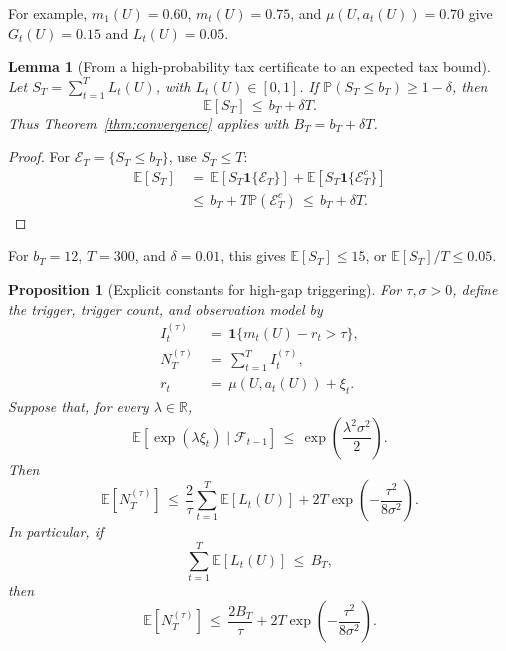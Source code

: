 \documentclass{article} %
\newtheorem{lemma}[theorem]{Lemma}
\newtheorem{proposition}[theorem]{Proposition}
\begin{document}
For example, \(m_1(U)=0.60\), \(m_t(U)=0.75\), and
\(\mu(U,a_t(U))=0.70\) give \(G_t(U)=0.15\) and \(L_t(U)=0.05\).

\begin{lemma}[From a high-probability tax certificate to an expected tax bound]
\label{lem:6}
Let \(S_T=\sum_{t=1}^T L_t(U)\), with \(L_t(U)\in[0,1]\).  If
\(\mathbb P(S_T\leq b_T)\geq1-\delta\), then
\begin{equation}
\mathbb{E}[S_T]
\,\leq\,
b_T+\delta T.
\end{equation}
Thus Theorem~\ref{thm:convergence} applies with \(B_T=b_T+\delta T\).
\end{lemma}

\begin{proof}
For \(\mathcal E_T=\{S_T\leq b_T\}\), use \(S_T\leq T\):
\begin{equation}
\begin{aligned}
\mathbb{E}[S_T]
&\,=\,
\mathbb{E}[S_T\mathbf{1}\{\mathcal{E}_T\}]
+
\mathbb{E}[S_T\mathbf{1}\{\mathcal{E}_T^{c}\}] \\
&\,\leq\,
b_T+T\mathbb P(\mathcal E_T^c)
\,\leq\,b_T+\delta T.
\end{aligned}
\end{equation}
\end{proof}

For \(b_T=12\), \(T=300\), and \(\delta=0.01\), this gives
\(\mathbb E[S_T]\leq15\), or \(\mathbb E[S_T]/T\leq0.05\).

\begin{proposition}[Explicit constants for high-gap triggering]
\label{prop:12}
For \(\tau,\sigma>0\), define the trigger, trigger count, and observation
model by
\begin{align}
\label{eq:app-fifth-trigger-def}
I_t^{(\tau)}
&\,=\,
\mathbf 1\{m_t(U)-r_t>\tau\},
\\
\label{eq:app-fifth-trigger-count}
N_T^{(\tau)}
&\,=\,
\sum_{t=1}^T I_t^{(\tau)},
\\
\label{eq:app-fifth-reward-noise}
r_t
&\,=\,
\mu(U,a_t(U))+\xi_t.
\end{align}
Suppose that, for every \(\lambda\in\mathbb R\),
\begin{equation}
\label{eq:app-fifth-subg}
\mathbb{E}\!\left[
\exp(\lambda \xi_t)\mid \mathcal{F}_{t-1}
\right]
\,\leq\,
\exp\!\left(\frac{\lambda^2\sigma^2}{2}\right).
\end{equation}
Then
\begin{equation}
\label{eq:app-fifth-trigger-bound}
\mathbb{E}\!\left[N_T^{(\tau)}\right]
\,\leq\,
\frac{2}{\tau}
\sum_{t=1}^{T}\mathbb{E}[L_t(U)]
+
2T\exp\!\left(-\frac{\tau^2}{8\sigma^2}\right).
\end{equation}
In particular, if
\begin{equation}
\label{eq:app-fifth-trigger-BT-assumption}
\sum_{t=1}^T\mathbb E[L_t(U)]\,\leq\, B_T,
\end{equation}
then
\begin{equation}
\label{eq:app-fifth-trigger-BT}
\mathbb{E}\!\left[N_T^{(\tau)}\right]
\,\leq\,
\frac{2B_T}{\tau}
+
2T\exp\!\left(-\frac{\tau^2}{8\sigma^2}\right).
\end{equation}
\end{proposition}
\end{document}
